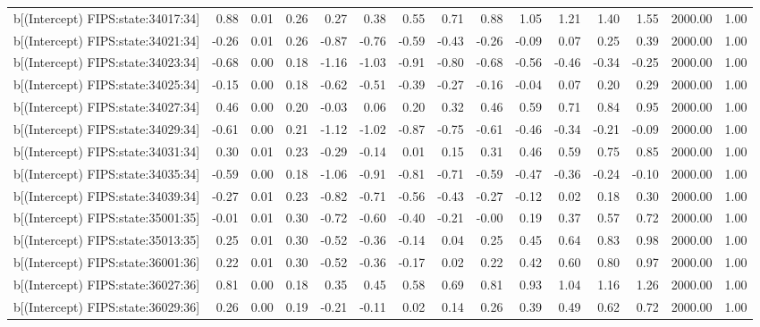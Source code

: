 \begin{table}[ht]
\begin{tabular}{rrrrrrrrrrrrrrr}
  b[(Intercept) FIPS:state:34017:34] & 0.88 & 0.01 & 0.26 & 0.27 & 0.38 & 0.55 & 0.71 & 0.88 & 1.05 & 1.21 & 1.40 & 1.55 & 2000.00 & 1.00 \\ 
  b[(Intercept) FIPS:state:34021:34] & -0.26 & 0.01 & 0.26 & -0.87 & -0.76 & -0.59 & -0.43 & -0.26 & -0.09 & 0.07 & 0.25 & 0.39 & 2000.00 & 1.00 \\ 
  b[(Intercept) FIPS:state:34023:34] & -0.68 & 0.00 & 0.18 & -1.16 & -1.03 & -0.91 & -0.80 & -0.68 & -0.56 & -0.46 & -0.34 & -0.25 & 2000.00 & 1.00 \\ 
  b[(Intercept) FIPS:state:34025:34] & -0.15 & 0.00 & 0.18 & -0.62 & -0.51 & -0.39 & -0.27 & -0.16 & -0.04 & 0.07 & 0.20 & 0.29 & 2000.00 & 1.00 \\ 
  b[(Intercept) FIPS:state:34027:34] & 0.46 & 0.00 & 0.20 & -0.03 & 0.06 & 0.20 & 0.32 & 0.46 & 0.59 & 0.71 & 0.84 & 0.95 & 2000.00 & 1.00 \\ 
  b[(Intercept) FIPS:state:34029:34] & -0.61 & 0.00 & 0.21 & -1.12 & -1.02 & -0.87 & -0.75 & -0.61 & -0.46 & -0.34 & -0.21 & -0.09 & 2000.00 & 1.00 \\ 
  b[(Intercept) FIPS:state:34031:34] & 0.30 & 0.01 & 0.23 & -0.29 & -0.14 & 0.01 & 0.15 & 0.31 & 0.46 & 0.59 & 0.75 & 0.85 & 2000.00 & 1.00 \\ 
  b[(Intercept) FIPS:state:34035:34] & -0.59 & 0.00 & 0.18 & -1.06 & -0.91 & -0.81 & -0.71 & -0.59 & -0.47 & -0.36 & -0.24 & -0.10 & 2000.00 & 1.00 \\ 
  b[(Intercept) FIPS:state:34039:34] & -0.27 & 0.01 & 0.23 & -0.82 & -0.71 & -0.56 & -0.43 & -0.27 & -0.12 & 0.02 & 0.18 & 0.30 & 2000.00 & 1.00 \\ 
  b[(Intercept) FIPS:state:35001:35] & -0.01 & 0.01 & 0.30 & -0.72 & -0.60 & -0.40 & -0.21 & -0.00 & 0.19 & 0.37 & 0.57 & 0.72 & 2000.00 & 1.00 \\ 
  b[(Intercept) FIPS:state:35013:35] & 0.25 & 0.01 & 0.30 & -0.52 & -0.36 & -0.14 & 0.04 & 0.25 & 0.45 & 0.64 & 0.83 & 0.98 & 2000.00 & 1.00 \\ 
  b[(Intercept) FIPS:state:36001:36] & 0.22 & 0.01 & 0.30 & -0.52 & -0.36 & -0.17 & 0.02 & 0.22 & 0.42 & 0.60 & 0.80 & 0.97 & 2000.00 & 1.00 \\ 
  b[(Intercept) FIPS:state:36027:36] & 0.81 & 0.00 & 0.18 & 0.35 & 0.45 & 0.58 & 0.69 & 0.81 & 0.93 & 1.04 & 1.16 & 1.26 & 2000.00 & 1.00 \\ 
  b[(Intercept) FIPS:state:36029:36] & 0.26 & 0.00 & 0.19 & -0.21 & -0.11 & 0.02 & 0.14 & 0.26 & 0.39 & 0.49 & 0.62 & 0.72 & 2000.00 & 1.00 \\ 

\end{tabular}
\end{table}
